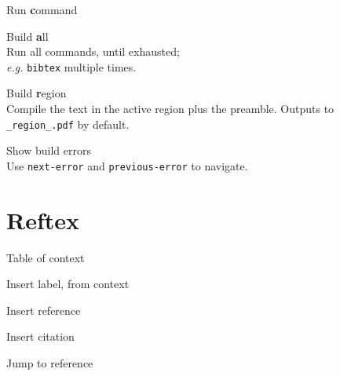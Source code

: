 \documentclass[landscape]{article}
\newcommand{\kbd}[1]{\colorbox{gray!10!}{\texttt{#1}}}
\newcommand{\element}[2][-]{\item[#1] \parbox[t]{\linewidth}{#2}}
\begin{document}
\begin{multicols}{3}
\begin{description}[align=left,labelwidth=1.5cm]
\element[\kbd{C-c C-c}]{ Run \textbf{c}ommand }
\element[\kbd{C-c C-a}]{ Build \textbf{a}ll \\
  Run all commands, until exhausted; \\
  \textit{e.g.} \texttt{bibtex} multiple times. }
\element[\kbd{C-c C-r}]{ Build \textbf{r}egion \\
  Compile the text in the active region plus the preamble. Outputs to \texttt{\_region\_.pdf} by default.}
\element[\kbd{C-c \`}]{ Show build errors \\
  Use \texttt{next-error} and \texttt{previous-error} to navigate. }
\end{description}

\section*{Reftex}

\begin{description}[align=left,labelwidth=1cm]
\element[\kbd{C-c =}]{ Table of context }
\element[\kbd{C-c (}]{ Insert label, from context }
\element[\kbd{C-c )}]{ Insert reference }
\element[\kbd{C-c [}]{  Insert citation }
\element[\kbd{C-c \&}]{ Jump to reference }
\end{description}

\end{multicols}
\end{document}
